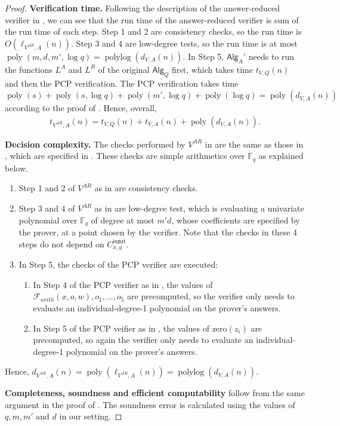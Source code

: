 \documentclass[11pt]{article}
\theoremstyle{plain}
\theoremstyle{definition}
\newcommand{\poly} {\ensuremath{\operatorname{poly}}}
\newcommand{\polylog} {\ensuremath{\operatorname{polylog}}}
\newcommand{\1}{\mathbb{1}} %
\newcommand{\bF}{\mathbb{F}}
\newcommand{\ipt}{\mathsf{input}}
\newcommand{\Alg}{\mathsf{Alg}}
\begin{document}
\begin{proof}
    \textbf{Verification time.} Following the description of the answer-reduced verifier in \cite[Figure 14]{JNVWY'20},
    we can see that the run time of the answer-reduced verifier is sum of the run time of each step.
    Step 1 and 2 are consistency checks, so the run time is $O(\ell_{V^{AR},A}(n))$.
    Step 3 and 4 are low-degree tests, so the run time is at most $\poly(m,d,m',\log q) = \polylog( d_{V,A}(n))$.
    In Step 5, $\Alg_A'$ needs to run the functions $L^A$ and $L^B$ of the original $\Alg_Q$ first, which takes time $t_{V,Q}(n)$ and then
    the PCP verification.
    The PCP verification takes time $\poly(s) + \poly(s, \log q) + \poly(m',\log q) + \poly(\log q)= \poly(d_{V,A}(n))$ according to the proof of \cite[Theorem 10.25]{JNVWY'20}. Hence, overall,
    \begin{align*}
        t_{V^{AR},A}(n) = t_{V,Q}(n) + t_{V,A}(n) + \poly(d_{V,A}(n)).
    \end{align*}

    \textbf{Decision complexity.} The checks performed by $V^{AR}$ in \cite{10.1145/3564246.3585208} are the same as those in \cite{JNVWY'20},  
    which are specified in \cite[Figure 14]{JNVWY'20}. 
    These checks are simple arithmetics over $\bF_q$ as explained below.
    \begin{enumerate}
        \item Step 1 and 2 of $V^{AR}$ as in \cite[Figure 14]{JNVWY'20} are consistency checks.
        \item Step 3 and 4 of $V^{AR}$ as in \cite[Figure 14]{JNVWY'20} are low-degree test, which is evaluating a univariate polynomial over $\bF_q$ of degree at most $m'd$, whose coefficients are specified by the prover, at a point chosen by the verifier.
        Note that the checks in these 4 steps do not depend on $C^{\ipt}_{x,y}$.
        \item In Step 5, the checks of the PCP verifier are executed:
        \begin{enumerate}
            \item In Step 4 of the PCP verifier as in \cite[Figure 13]{JNVWY'20}, the values of $\mathcal{F}_{arith}(x,o,w), o_1, \dots, o_5$ are precomputed, so the verifier only needs to evaluate an individual-degree-1 polynomial on the prover's answers.
            \item In Step 5 of the PCP veifier as in \cite[Figure 13]{JNVWY'20}, the values of $\mathrm{zero}(z_i)$ are precomputed, so again the verifier only needs to evaluate an individual-degree-1 polynomial on the prover's answers.
        \end{enumerate}
    \end{enumerate}
    Hence, $d_{V^{AR},A}(n) = \poly(\ell_{V^{AR},A}(n)) = \polylog(d_{V,A}(n))$.

    \textbf{Completeness, soundness and efficient computability} follow from the same argument in the proof of \cite[Theorem 51]{10.1145/3564246.3585208}.
    The soundness error is calculated using the values of $q, m, m'$ and $d$ in our setting.
\end{proof}
\end{document}
